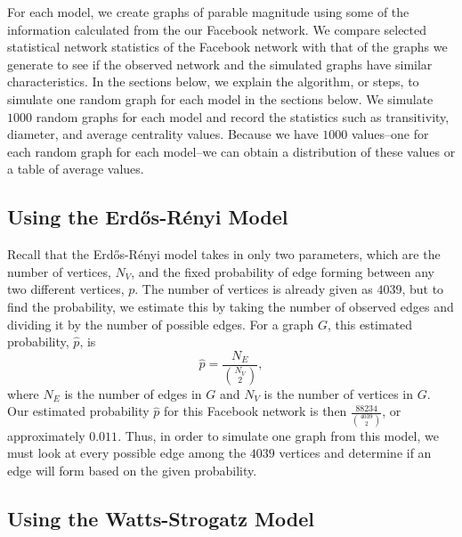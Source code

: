 \documentclass[12pt,twoside]{amherstthesis}
\begin{document}
  For each model, we create graphs of parable magnitude using some of the
  information calculated from the our Facebook network. We compare
  selected statistical network statistics of the Facebook network with
  that of the graphs we generate to see if the observed network and the
  simulated graphs have similar characteristics. In the sections below, we
  explain the algorithm, or steps, to simulate one random graph for each
  model in the sections below. We simulate \(1000\) random graphs for each
  model and record the statistics such as transitivity, diameter, and
  average centrality values. Because we have \(1000\) values--one for each
  random graph for each model--we can obtain a distribution of these
  values or a table of average values.
  
  \subsection{Using the Erdős-Rényi
  Model}\label{using-the-erdos-renyi-model}
  
  Recall that the Erdős-Rényi model takes in only two parameters, which
  are the number of vertices, \(N_{V}\), and the fixed probability of edge
  forming between any two different vertices, \(p\). The number of
  vertices is already given as \(4039\), but to find the probability, we
  estimate this by taking the number of observed edges and dividing it by
  the number of possible edges. For a graph \(G\), this estimated
  probability, \(\hat{p}\), is
  \[\hat{p} = \frac {N_{E}} {{N_{V} \choose 2}},\] where \(N_{E}\) is the
  number of edges in \(G\) and \(N_{V}\) is the number of vertices in
  \(G\). Our estimated probability \(\hat{p}\) for this Facebook network
  is then \(\frac {88234} {{4039 \choose 2}}\), or approximately
  \(0.011\). Thus, in order to simulate one graph from this model, we must
  look at every possible edge among the \(4039\) vertices and determine if
  an edge will form based on the given probability.
  
  \subsection{Using the Watts-Strogatz
  Model}\label{using-the-watts-strogatz-model}
  
\end{document}
